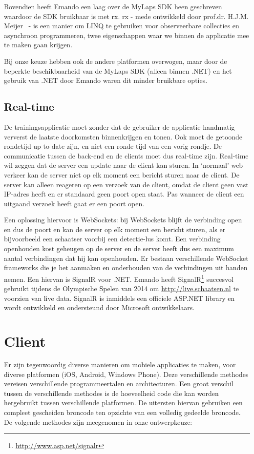 Bovendien heeft Emando een laag over de MyLaps SDK heen geschreven waardoor de SDK bruikbaar is met \acf{rx}. \ac{rx} - mede ontwikkeld door prof.dr. H.J.M. Meijer~\cite{meijer2011world} - is een manier om LINQ te gebruiken voor observeerbare collecties en asynchroon programmeren, twee eigenschappen waar we binnen de applicatie mee te maken gaan krijgen.

Bij onze keuze hebben ook de andere platformen overwogen, maar door de beperkte beschikbaarheid van de MyLaps SDK (alleen binnen .NET) en het gebruik van .NET door Emando waren dit minder bruikbare opties.

\subsection{Real-time}\label{sec:orientatie-real-time}
De trainingsapplicatie moet zonder dat de gebruiker de applicatie handmatig ververst de laatste doorkomsten binnenkrijgen en tonen. Ook moet de getoonde rondetijd up to date zijn, en niet een ronde tijd van een vorig rondje. De communicatie tussen de back-end en de clients moet dus real-time zijn. Real-time wil zeggen dat de server een update naar de client kan sturen. In `normaal' web verkeer kan de server niet op elk moment een bericht sturen naar de client. De server kan alleen reageren op een verzoek van de client, omdat de client geen vast IP-adres heeft en er standaard geen poort open staat. Pas wanneer de client een uitgaand verzoek heeft gaat er een poort open.

Een oplossing hiervoor is WebSockets: bij WebSockets blijft de verbinding open en dus de poort en kan de server op elk moment een bericht sturen, als er bijvoorbeeld een schaatser voorbij een detectie-lus komt. Een verbinding openhouden kost geheugen op de server en de server heeft dus een maximum aantal verbindingen dat hij kan openhouden. Er bestaan verschillende WebSocket frameworks die je het aanmaken en onderhouden van de verbindingen uit handen nemen. Een hiervan is SignalR voor .NET. Emando heeft SignalR\footnote{\url{http://www.asp.net/signalr}} succesvol gebruikt tijdens de Olympische Spelen van 2014 om \url{http://live.schaatsen.nl} te voorzien van live data. SignalR is inmiddels een officiele ASP.NET library en wordt ontwikkeld en ondersteund door Microsoft ontwikkelaars.

\section{Client} \label{sec:orientatie-client}
Er zijn tegenwoordig diverse manieren om mobiele applicaties te maken, voor diverse platformen (iOS, Android, Windows Phone). Deze verschillende methodes vereisen verschillende programmeertalen en architecturen. Een groot verschil tussen de verschillende methodes is de hoeveelheid code die kan worden hergebruikt tussen verschillende platformen. De uitersten hiervan gebruiken een compleet gescheiden broncode ten opzichte van een volledig gedeelde broncode. De volgende methodes zijn meegenomen in onze ontwerpkeuze:

